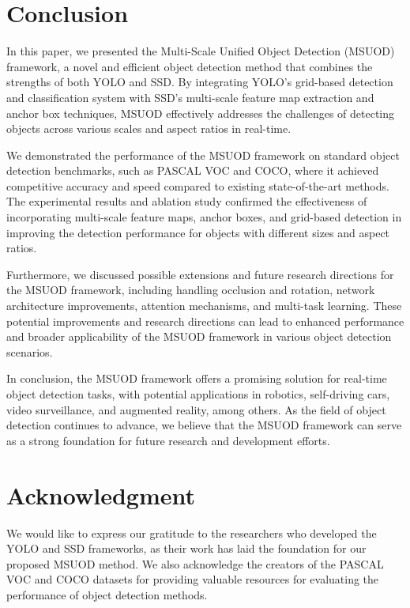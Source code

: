 \documentclass[conference]{IEEEtran}
\begin{document}
\begin{itemize}
\section{Conclusion}

In this paper, we presented the Multi-Scale Unified Object Detection (MSUOD) framework, a novel and efficient object detection method that combines the strengths of both YOLO and SSD. By integrating YOLO's grid-based detection and classification system with SSD's multi-scale feature map extraction and anchor box techniques, MSUOD effectively addresses the challenges of detecting objects across various scales and aspect ratios in real-time.


We demonstrated the performance of the MSUOD framework on standard object detection benchmarks, such as PASCAL VOC and COCO, where it achieved competitive accuracy and speed compared to existing state-of-the-art methods. The experimental results and ablation study confirmed the effectiveness of incorporating multi-scale feature maps, anchor boxes, and grid-based detection in improving the detection performance for objects with different sizes and aspect ratios.


Furthermore, we discussed possible extensions and future research directions for the MSUOD framework, including handling occlusion and rotation, network architecture improvements, attention mechanisms, and multi-task learning. These potential improvements and research directions can lead to enhanced performance and broader applicability of the MSUOD framework in various object detection scenarios.


In conclusion, the MSUOD framework offers a promising solution for real-time object detection tasks, with potential applications in robotics, self-driving cars, video surveillance, and augmented reality, among others. As the field of object detection continues to advance, we believe that the MSUOD framework can serve as a strong foundation for future research and development efforts.

\section*{Acknowledgment}

We would like to express our gratitude to the researchers who developed the YOLO and SSD frameworks, as their work has laid the foundation for our proposed MSUOD method. We also acknowledge the creators of the PASCAL VOC and COCO datasets for providing valuable resources for evaluating the performance of object detection methods.



\end{itemize}
\end{document}
